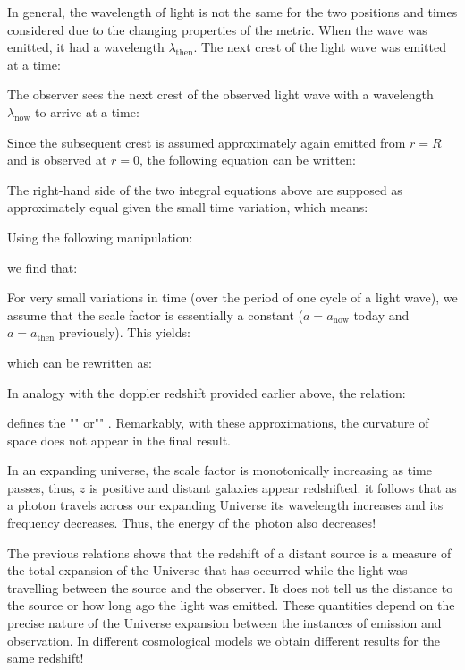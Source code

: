 	In general, the wavelength of light is not the same for the two positions and times considered due to the changing properties of the metric. When the wave was emitted, it had a wavelength $\lambda_\text{then}$. The next crest of the light wave was emitted at a time:
	
	The observer sees the next crest of the observed light wave with a wavelength $\lambda_\text{now}$ to arrive at a time:
	
	Since the subsequent crest is assumed approximately again emitted from $r = R$ and is observed at $r = 0$, the following equation can be written:
	
	The right-hand side of the two integral equations above are supposed as approximately equal given the small time variation, which means:
	
	Using the following manipulation:
	
	we find that:
	
	For very small variations in time (over the period of one cycle of a light wave), we assume that the scale factor is essentially a constant ($a = a_\text{now}$ today and $a = a_\text{then}$ previously). This yields:
	
	which can be rewritten as:
	
	In analogy with the doppler redshift provided earlier above, the relation:
	
	defines the "" or"" . Remarkably, with these approximations, the curvature of space does not appear in the final result.
	
	In an expanding universe, the scale factor is monotonically increasing as time passes, thus, $z$ is positive and distant galaxies appear redshifted. it follows that as a photon travels across our expanding Universe its wavelength increases and its frequency decreases. Thus, the energy of the photon also decreases!
	
	The previous relations shows that the redshift of a distant source is a measure of the total expansion of the Universe that has occurred while the light was travelling between the source and the observer. It does not tell us the distance to the source or how long ago the light was emitted. These quantities depend on the precise nature of the Universe expansion between the instances of emission and observation. In different cosmological models we obtain different results for the same redshift!
	
